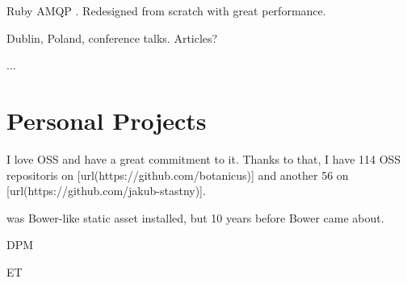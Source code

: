 \startitemize
  \item Ruby AMQP . Redesigned from scratch with great performance.
  \item Dublin, Poland, conference talks. Articles?
  \item ...
\stopitemize

\blank \section{Personal Projects}
I love OSS and have a great commitment to it.
Thanks to that, I have 114 OSS repositoris on [url(https://github.com/botanicus)] and another 56 on [url(https://github.com/jakub-stastny)].


\startitemize
  \item \from[pupu][P] was Bower-like static asset installed, but 10 years before Bower came about.

  \item DPM
  \item ET
\stopitemize
